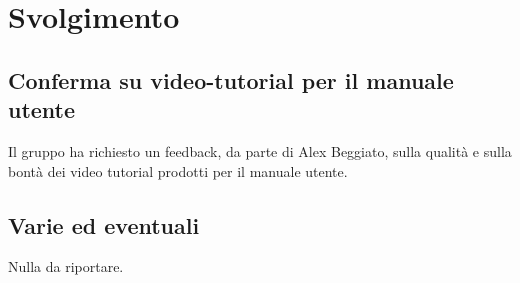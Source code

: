 \newpage
\section*{Svolgimento}

	\subsection*{Conferma su video-tutorial per il manuale utente}
		Il gruppo ha richiesto un feedback, da parte di Alex Beggiato, sulla qualità e sulla bontà dei video tutorial prodotti per il manuale utente.

	\subsection*{Varie ed eventuali}
		Nulla da riportare.
